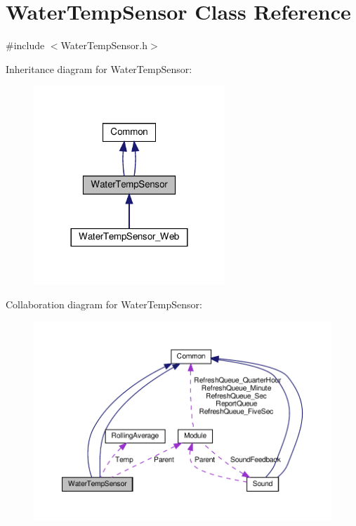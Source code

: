 \hypertarget{class_water_temp_sensor}{}\section{Water\+Temp\+Sensor Class Reference}
\label{class_water_temp_sensor}


{\ttfamily \#include $<$Water\+Temp\+Sensor.\+h$>$}



Inheritance diagram for Water\+Temp\+Sensor\+:
\nopagebreak
\begin{figure}[H]
\begin{center}
\leavevmode
\includegraphics[width=204pt]{class_water_temp_sensor__inherit__graph}
\end{center}
\end{figure}


Collaboration diagram for Water\+Temp\+Sensor\+:
\nopagebreak
\begin{figure}[H]
\begin{center}
\leavevmode
\includegraphics[width=350pt]{class_water_temp_sensor__coll__graph}
\end{center}
\end{figure}
